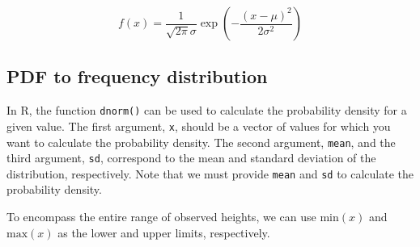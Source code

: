 \documentclass[
]{book}
\newenvironment{Shaded}{\begin{snugshade}}{\end{snugshade}}
\newcommand{\AttributeTok}[1]{\textcolor[rgb]{0.77,0.63,0.00}{#1}}
\newcommand{\CommentTok}[1]{\textcolor[rgb]{0.56,0.35,0.01}{\textit{#1}}}
\newcommand{\DecValTok}[1]{\textcolor[rgb]{0.00,0.00,0.81}{#1}}
\newcommand{\FunctionTok}[1]{\textcolor[rgb]{0.00,0.00,0.00}{#1}}
\newcommand{\NormalTok}[1]{#1}
\newcommand{\OtherTok}[1]{\textcolor[rgb]{0.56,0.35,0.01}{#1}}
\newcommand{\SpecialCharTok}[1]{\textcolor[rgb]{0.00,0.00,0.00}{#1}}
\newcommand{\StringTok}[1]{\textcolor[rgb]{0.31,0.60,0.02}{#1}}
\begin{document}
\[
f(x) = \frac{1}{\sqrt{2 \pi} \sigma} \exp\left(-\frac{(x-\mu)^2}{2\sigma^2}\right)
\]

\hypertarget{pdf-to-frequency-distribution}{%
\subsection{PDF to frequency distribution}\label{pdf-to-frequency-distribution}}

In R, the function \texttt{dnorm()} can be used to calculate the probability density for a given value. The first argument, \texttt{x}, should be a vector of values for which you want to calculate the probability density. The second argument, \texttt{mean}, and the third argument, \texttt{sd}, correspond to the mean and standard deviation of the distribution, respectively. Note that we must provide \texttt{mean} and \texttt{sd} to calculate the probability density.

To encompass the entire range of observed heights, we can use \(\text{min}(x)\) and \(\text{max}(x)\) as the lower and upper limits, respectively.

\begin{Shaded}
\end{Shaded}
\end{document}
